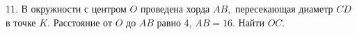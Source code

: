 11. В окружности с центром $O$ проведена хорда $AB,$ пересекающая диаметр $CD$ в точке $K.$ Расстояние от  $O$ до $AB$ равно 4, $AB=16.$ Найти $OC.$\\
